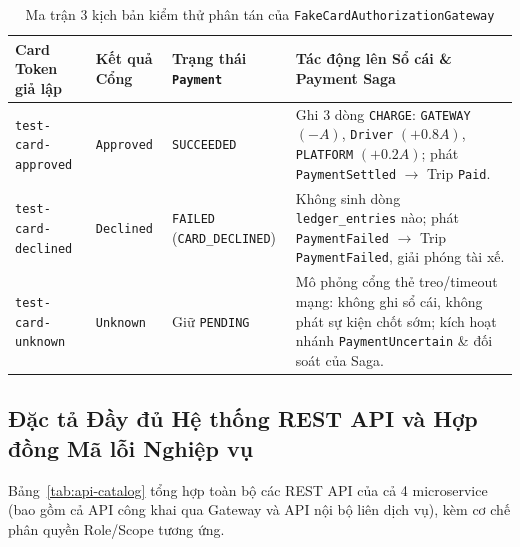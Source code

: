 \documentclass[12pt,a4paper]{article}
\begin{document}
{\footnotesize
\renewcommand{\arraystretch}{1.22}
\begin{table}[htbp]
\centering
\caption{Ma trận 3 kịch bản kiểm thử phân tán của \texttt{FakeCardAuthorizationGateway}}
\label{tab:fakecard-tokens}
\begin{tabularx}{\textwidth}{L{3.5cm} L{2.4cm} L{2.8cm} Y}
\toprule
\textbf{Card Token giả lập} & \textbf{Kết quả Cổng} & \textbf{Trạng thái \texttt{Payment}} & \textbf{Tác động lên Sổ cái \& Payment Saga} \\
\midrule
\texttt{test-card-approved} & \texttt{Approved} & \texttt{SUCCEEDED} & Ghi 3 dòng \texttt{CHARGE}: \texttt{GATEWAY} $(-A)$, \texttt{Driver} $(+0.8A)$, \texttt{PLATFORM} $(+0.2A)$; phát \texttt{PaymentSettled} $\rightarrow$ Trip \texttt{Paid}. \\
\addlinespace
\texttt{test-card-declined} & \texttt{Declined} & \texttt{FAILED} \newline (\texttt{CARD\_DECLINED}) & Không sinh dòng \texttt{ledger\_entries} nào; phát \texttt{PaymentFailed} $\rightarrow$ Trip \texttt{PaymentFailed}, giải phóng tài xế. \\
\addlinespace
\texttt{test-card-unknown} & \texttt{Unknown} & Giữ \texttt{PENDING} & Mô phỏng cổng thẻ treo/timeout mạng: không ghi sổ cái, không phát sự kiện chốt sớm; kích hoạt nhánh \texttt{PaymentUncertain} \& đối soát của Saga. \\
\bottomrule
\end{tabularx}
\end{table}
\renewcommand{\arraystretch}{1.0}
}

\subsection{Đặc tả Đầy đủ Hệ thống REST API và Hợp đồng Mã lỗi Nghiệp vụ}
Bảng~\ref{tab:api-catalog} tổng hợp toàn bộ các REST API của cả 4 microservice (bao gồm cả API công khai qua Gateway và API nội bộ liên dịch vụ), kèm cơ chế phân quyền Role/Scope tương ứng.
\end{document}
